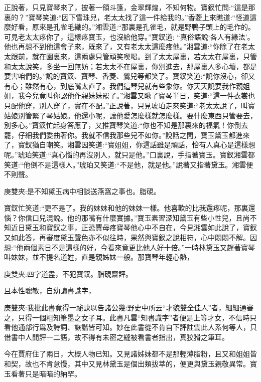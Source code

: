 \begin{parag}
    正說著，只見寶琴來了，披著一領斗篷，金翠輝煌，不知何物。寶釵忙問:“這是那裏的？”寶琴笑道:“因下雪珠兒，老太太找了這一件給我的。”香菱上來瞧道:“怪道這麼好看，原來是孔雀毛織的。”湘雲道:“那裏是孔雀毛，就是野鴨子頭上的毛作的。可見老太太疼你了，這樣疼寶玉，也沒給他穿。”寶釵道: “真俗語說‘各人有緣法’。他也再想不到他這會子來，既來了，又有老太太這麼疼他。”湘雲道:“你除了在老太太跟前，就在園裏來，這兩處只管頑笑喫喝。到了太太屋裏，若太太在屋裏，只管和太太說笑，多坐一回無妨；若太太不在屋裏，你別進去，那屋裏人多心壞，都是要害咱們的。”說的寶釵、寶琴、香菱、鶯兒等都笑了。寶釵笑道:“說你沒心，卻又有心；雖然有心，到底嘴太直了。我們這琴兒就有些象你。你天天說要我作親姐姐，我今兒竟叫你認他作親妹妹罷了。”湘雲又瞅了寶琴半日，笑道:“這一件衣裳也只配他穿，別人穿了，實在不配。”正說著，只見琥珀走來笑道:“老太太說了，叫寶姑娘別管緊了琴姑娘。他還小呢，讓他愛怎麼樣就怎麼樣。要什麼東西只管要去，別多心。”寶釵忙起身答應了，又推寶琴笑道:“你也不知是那裏來的福氣！你倒去罷，仔細我們委曲著你。我就不信我那些兒不如你。”說話之間，寶玉黛玉都進來了，寶釵猶自嘲笑。湘雲因笑道:“寶姐姐，你這話雖是頑話，恰有人真心是這樣想呢。”琥珀笑道:“真心惱的再沒別人，就只是他。”口裏說，手指著寶玉。寶釵湘雲都笑道:“他倒不是這樣人。”琥珀又笑道:“不是他，就是他。”說著又指著黛玉。湘雲便不則聲。\begin{note}庚雙夾:是不知黛玉病中相談送燕窩之事也。脂硯。\end{note}寶釵忙笑道:“更不是了。我的妹妹和他的妹妹一樣。他喜歡的比我還疼呢，那裏還惱？你信口兒混說。他的那嘴有什麼實據。”寶玉素習深知黛玉有些小性兒，且尚不知近日黛玉和寶釵之事，正恐賈母疼寶琴他心中不自在，今見湘雲如此說了，寶釵又如此答，再審度黛玉聲色亦不似往時，果然與寶釵之說相符，心中悶悶不解。因想:“他兩個素日不是這樣的好，今看來竟更比他人好十倍。”一時林黛玉又趕著寶琴叫妹妹，並不提名道姓，直是親姊妹一般。那寶琴年輕心熱，\begin{note}庚雙夾:四字道盡，不犯寶釵。脂硯齋評。\end{note}且本性聰敏，自幼讀書識字，\begin{note}庚雙夾:我批此書竟得一祕訣以告諸公幾:野史中所云“才貌雙全佳人”者，細細通審之，只得一個粗知筆墨之女子耳。此書凡雲“知書識字”者便是上等才女，不信時只看他通部行爲及詩詞、詼諧皆可知。妙在此書從不肯自下評註雲此人系何等人，只借書中人閒評一二語，故不得有未密之縫被看書者指出，真狡猾之筆耳。\end{note}今在賈府住了兩日，大概人物已知。又見諸姊妹都不是那輕薄脂粉，且又和姐姐皆和契，故也不肯怠慢，其中又見林黛玉是個出類拔萃的，便更與黛玉親敬異常。寶玉看著只是暗暗的納罕。
\end{parag}


